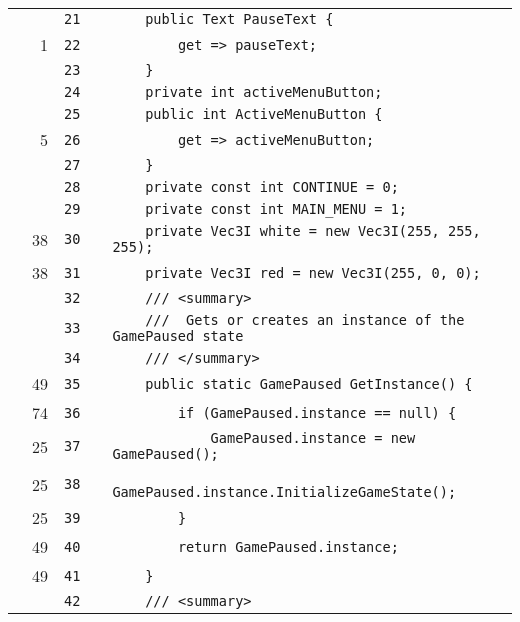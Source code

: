 \documentclass[a4paper,landscape,10pt]{article}
\begin{document}
\begin{longtable}[l]{lrrll}
\cellcolor{gray} &  & \verb~21~ & & \verb~    public Text PauseText {~\\
\cellcolor{green} & 1 & \verb~22~ & & \verb~        get => pauseText;~\\
\cellcolor{gray} &  & \verb~23~ & & \verb~    }~\\
\cellcolor{gray} &  & \verb~24~ & & \verb~    private int activeMenuButton;~\\
\cellcolor{gray} &  & \verb~25~ & & \verb~    public int ActiveMenuButton {~\\
\cellcolor{green} & 5 & \verb~26~ & & \verb~        get => activeMenuButton;~\\
\cellcolor{gray} &  & \verb~27~ & & \verb~    }~\\
\cellcolor{gray} &  & \verb~28~ & & \verb~    private const int CONTINUE = 0;~\\
\cellcolor{gray} &  & \verb~29~ & & \verb~    private const int MAIN_MENU = 1;~\\
\cellcolor{green} & 38 & \verb~30~ & & \verb~    private Vec3I white = new Vec3I(255, 255, 255);~\\
\cellcolor{green} & 38 & \verb~31~ & & \verb~    private Vec3I red = new Vec3I(255, 0, 0);~\\
\cellcolor{gray} &  & \verb~32~ & & \verb~    /// <summary>~\\
\cellcolor{gray} &  & \verb~33~ & & \verb~    ///  Gets or creates an instance of the GamePaused state~\\
\cellcolor{gray} &  & \verb~34~ & & \verb~    /// </summary>~\\
\cellcolor{green} & 49 & \verb~35~ & & \verb~    public static GamePaused GetInstance() {~\\
\cellcolor{green} & 74 & \verb~36~ & & \verb~        if (GamePaused.instance == null) {~\\
\cellcolor{green} & 25 & \verb~37~ & & \verb~            GamePaused.instance = new GamePaused();~\\
\cellcolor{green} & 25 & \verb~38~ & & \verb~            GamePaused.instance.InitializeGameState();~\\
\cellcolor{green} & 25 & \verb~39~ & & \verb~        }~\\
\cellcolor{green} & 49 & \verb~40~ & & \verb~        return GamePaused.instance;~\\
\cellcolor{green} & 49 & \verb~41~ & & \verb~    }~\\
\cellcolor{gray} &  & \verb~42~ & & \verb~    /// <summary>~\\

\end{longtable}
\end{document}
